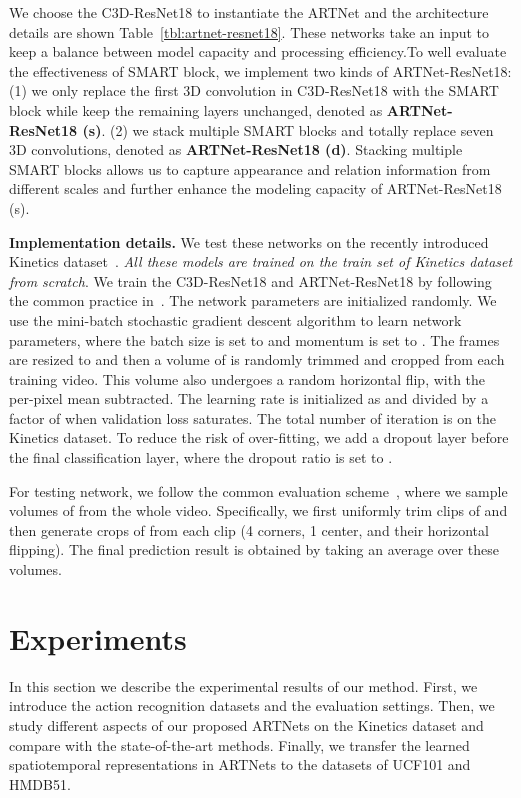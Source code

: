\documentclass[10pt,twocolumn,letterpaper]{article}
\begin{document}
We choose the C3D-ResNet18 to instantiate the ARTNet and the architecture details are shown Table~\ref{tbl:artnet-resnet18}. These networks take an  input to keep a balance between model capacity and processing efficiency.To well evaluate the effectiveness of SMART block, we implement two kinds of ARTNet-ResNet18: (1) we only replace the first 3D convolution in C3D-ResNet18 with the SMART block while keep the remaining layers unchanged, denoted as {\bf ARTNet-ResNet18 (s)}. (2) we stack multiple SMART blocks and totally replace seven 3D convolutions, denoted as {\bf ARTNet-ResNet18 (d)}. Stacking multiple SMART blocks allows us to capture appearance and relation information from different scales and further enhance the modeling capacity of ARTNet-ResNet18 (s).

{\bf Implementation details.} We test these networks on the recently introduced Kinetics dataset~\cite{KayCSZHVVGBNSZ17}. {\em All these models are trained on the train set of Kinetics dataset from scratch}. We train the C3D-ResNet18 and ARTNet-ResNet18 by following the common practice in~\cite{Tran17,KayCSZHVVGBNSZ17}. The network parameters are initialized randomly. We use the mini-batch stochastic gradient descent algorithm to learn network parameters, where the batch size is set to  and momentum is set to . The frames are resized to  and then a volume of  is randomly trimmed and cropped from each training video. This volume also undergoes a random horizontal flip, with the per-pixel mean subtracted. The learning rate is initialized as  and divided by a factor of  when validation loss saturates. The total number of iteration is  on the Kinetics dataset. To reduce the risk of over-fitting, we add a dropout layer before the final classification layer, where the dropout ratio is set to . 

For testing network, we follow the common evaluation scheme~\cite{Tran17,SimonyanZ14}, where we sample  volumes of  from the whole video. Specifically, we first uniformly trim  clips of  and then generate  crops of  from each clip (4 corners, 1 center, and their horizontal flipping). The final prediction result is obtained by taking an average over these  volumes.


\section{Experiments}

In this section we describe the experimental results of our method. First, we introduce the action recognition datasets and the evaluation settings. Then, we study different aspects of our proposed ARTNets on the Kinetics dataset and compare with the state-of-the-art methods. Finally, we transfer the learned spatiotemporal representations in ARTNets to the datasets of UCF101 and HMDB51.
\end{document}
